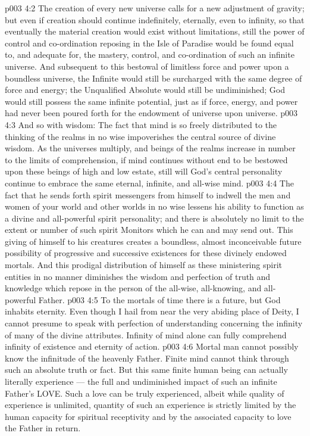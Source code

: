 \vs p003 4:2 The creation of every new universe calls for a new adjustment of gravity; but even if creation should continue indefinitely, eternally, even to infinity, so that eventually the material creation would exist without limitations, still the power of control and co\hyp{}ordination reposing in the Isle of Paradise would be found equal to, and adequate for, the mastery, control, and co\hyp{}ordination of such an infinite universe. And subsequent to this bestowal of limitless force and power upon a boundless universe, the Infinite would still be surcharged with the same degree of force and energy; the Unqualified Absolute would still be undiminished; God would still possess the same infinite potential, just as if force, energy, and power had never been poured forth for the endowment of universe upon universe.
\vs p003 4:3 And so with wisdom: The fact that mind is so freely distributed to the thinking of the realms in no wise impoverishes the central source of divine wisdom. As the universes multiply, and beings of the realms increase in number to the limits of comprehension, if mind continues without end to be bestowed upon these beings of high and low estate, still will God’s central personality continue to embrace the same eternal, infinite, and all\hyp{}wise mind.
\vs p003 4:4 The fact that he sends forth spirit messengers from himself to indwell the men and women of your world and other worlds in no wise lessens his ability to function as a divine and all\hyp{}powerful spirit personality; and there is absolutely no limit to the extent or number of such spirit Monitors which he can and may send out. This giving of himself to his creatures creates a boundless, almost inconceivable future possibility of progressive and successive existences for these divinely endowed mortals. And this prodigal distribution of himself as these ministering spirit entities in no manner diminishes the wisdom and perfection of truth and knowledge which repose in the person of the all\hyp{}wise, all\hyp{}knowing, and all\hyp{}powerful Father.
\vs p003 4:5 \pc To the mortals of time there is a future, but God inhabits eternity. Even though I hail from near the very abiding place of Deity, I cannot presume to speak with perfection of understanding concerning the infinity of many of the divine attributes. Infinity of mind alone can fully comprehend infinity of existence and eternity of action.
\vs p003 4:6 \pc Mortal man cannot possibly know the infinitude of the heavenly Father. Finite mind cannot think through such an absolute truth or fact. But this same finite human being can actually  literally experience --- the full and undiminished impact of such an infinite Father’s LOVE. Such a love can be truly experienced, albeit while quality of experience is unlimited, quantity of such an experience is strictly limited by the human capacity for spiritual receptivity and by the associated capacity to love the Father in return.
